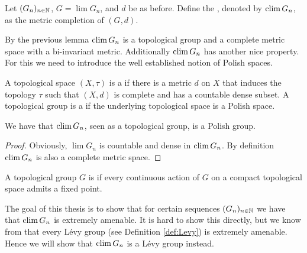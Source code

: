 \begin{definition}
	Let $(G_n)_{n\in\mathbb{N}}$, $G=\lim G_n$, and $d$ be as before. Define the , denoted by $\operatorname{clim} G_n$, as the metric completion of $(G,d)$.
\end{definition}
By the previous lemma $\operatorname{clim} G_n$ is a topological group and a complete metric space with a bi-invariant metric. 
Additionally $\operatorname{clim} G_n$ has another nice property. For this we need to introduce the well established notion of Polish spaces. 
\begin{definition}
	A topological space $(X,\tau)$ is a  if there is a metric $d$ on $X$ that induces the topology $\tau$ such that $(X,d)$ is complete and has a countable dense subset. A topological group is a  if the underlying topological space is a Polish space.
\end{definition}
		
\begin{lemma}\label{lem:climIsPolish}
	We have that $\operatorname{clim} G_n$, seen as a topological group, is a Polish group.
\end{lemma}
\begin{proof}
	Obviously, $\lim G_n$ is countable and dense in $\operatorname{clim} G_n$. By definition $\operatorname{clim} G_n$ is also a complete metric space.
\end{proof}
		
\begin{definition}
	A topological group $G$ is  if every continuous action of $G$ on a compact topological space admits a fixed point.
\end{definition}
		
The goal of this thesis is to show that for certain sequences $(G_n)_{n\in\mathbb{N}}$ we have that $\operatorname{clim} G_n$ is extremely amenable. It is hard to show this directly, but we know from \cite{Levy} that every L\'evy group (see Definition \ref{def:Levy}) is extremely amenable. Hence we will show that $\operatorname{clim} G_n$ is a L\'evy group instead.
		
		
		
		

